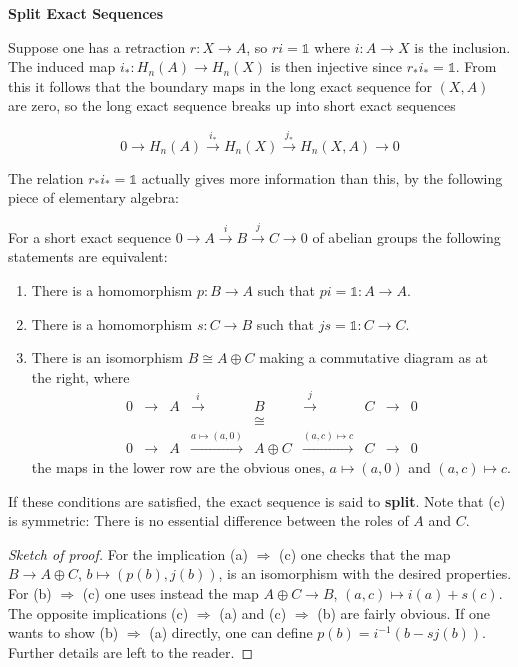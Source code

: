 \textbf{Split Exact Sequences}

Suppose one has a retraction $r: X \to A$, so $ri = \mathbb{1}$ where $i: A \to X$ is the inclusion.
The induced map $i_*: H_n(A) \to H_n(X)$ is then injective since $r_* i_* = \mathbb{1}$. From this it
follows that the boundary maps in the long exact sequence for $(X, A)$ are zero, so the
long exact sequence breaks up into short exact sequences

\[
0 \to H_n(A) \xrightarrow{i_*} H_n(X) \xrightarrow{j_*} H_n(X, A) \to 0
\]

The relation $r_* i_* = \mathbb{1}$ actually gives more information than this, by the following
piece of elementary algebra:

\begin{lemma}
\label{lem:splitting-lemma}
\uses{}
For a short exact sequence $0 \to A \xrightarrow{i} B \xrightarrow{j} C \to 0$ of abelian groups the following statements are equivalent:
\begin{enumerate}
\item[(a)] There is a homomorphism $p: B \to A$ such that $pi = \mathbb{1}: A \to A$.
\item[(b)] There is a homomorphism $s: C \to B$ such that $js = \mathbb{1}: C \to C$.
\item[(c)] There is an isomorphism $B \cong A \oplus C$ making a commutative diagram as at the right, where
\[
\begin{array}{ccccccccc}
0 & \to & A & \xrightarrow{i} & B & \xrightarrow{j} & C & \to & 0 \\
  &     &   &                & \cong &               &   &     &  \\
0 & \to & A & \xrightarrow{a \mapsto (a,0)} & A \oplus C & \xrightarrow{(a,c) \mapsto c} & C & \to & 0
\end{array}
\]
the maps in the lower row are the obvious ones, $a \mapsto (a, 0)$ and $(a, c) \mapsto c$.
\end{enumerate}

If these conditions are satisfied, the exact sequence is said to \textbf{split}. Note that (c) is symmetric: There is no essential difference between the roles of $A$ and $C$.
\end{lemma}

\begin{proof}[Sketch of proof]
For the implication (a) $\Rightarrow$ (c) one checks that the map $B \to A \oplus C$, $b \mapsto (p(b), j(b))$, is an isomorphism with the desired properties. For (b) $\Rightarrow$ (c) one uses instead the map $A \oplus C \to B$, $(a, c) \mapsto i(a) + s(c)$. The opposite implications (c) $\Rightarrow$ (a) and (c) $\Rightarrow$ (b) are fairly obvious. If one wants to show (b) $\Rightarrow$ (a) directly, one can define $p(b) = i^{-1}(b - sj(b))$. Further details are left to the reader.
\end{proof}


